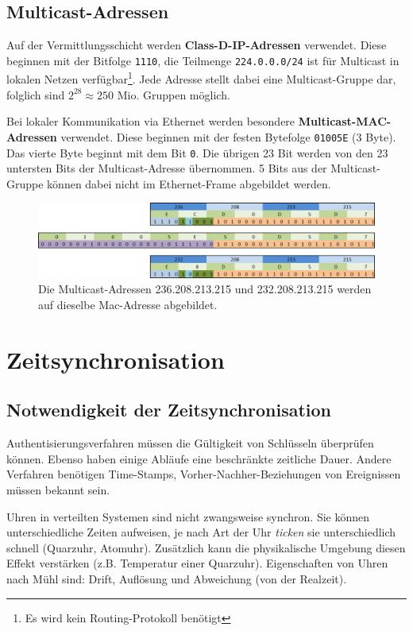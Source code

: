 \documentclass{article} %
\begin{document}
\subsection{Multicast-Adressen}
Auf der Vermittlungsschicht werden \textbf{Class-D-IP-Adressen} verwendet.
Diese beginnen mit der Bitfolge \texttt{1110}, die Teilmenge \texttt{224.0.0.0/24} ist für Multicast in lokalen Netzen verfügbar\footnote{Es wird kein Routing-Protokoll benötigt\cite{tanenbaum2003computer}}.
Jede Adresse stellt dabei eine Multicast-Gruppe dar, folglich sind $2^{28} \approx 250$ Mio. Gruppen möglich.

Bei lokaler Kommunikation via Ethernet werden besondere \textbf{Multicast-MAC-Adressen} verwendet.
Diese beginnen mit der festen Bytefolge \texttt{01005E} (3 Byte).
Das vierte Byte beginnt mit dem Bit \texttt{0}.
Die übrigen 23 Bit werden von den 23 untersten Bits der Multicast-Adresse übernommen.
5 Bits aus der Multicast-Gruppe können dabei nicht im Ethernet-Frame abgebildet werden.
\begin{figure}[ht]
	\centering
\includegraphics[width=15cm]{img/multicast_adressen}
\caption{Die Multicast-Adressen 236.208.213.215 und 232.208.213.215 werden auf dieselbe Mac-Adresse abgebildet.}
\end{figure}
\section{Zeitsynchronisation}

\subsection{Notwendigkeit der Zeitsynchronisation}
Authentisierungsverfahren müssen die Gültigkeit von Schlüsseln überprüfen können.
Ebenso haben einige Abläufe eine beschränkte zeitliche Dauer.
Andere Verfahren benötigen Time-Stamps, Vorher-Nachher-Beziehungen von Ereignissen müssen bekannt sein.

Uhren in verteilten Systemen sind nicht zwangsweise synchron.
Sie können unterschiedliche Zeiten aufweisen, je nach Art der Uhr \emph{ticken} sie unterschiedlich schnell (Quarzuhr, Atomuhr).
Zusätzlich kann die physikalische Umgebung diesen Effekt verstärken (z.B. Temperatur einer Quarzuhr).
Eigenschaften von Uhren nach Mühl sind: Drift, Auflösung und Abweichung (von der Realzeit).
\end{document}
